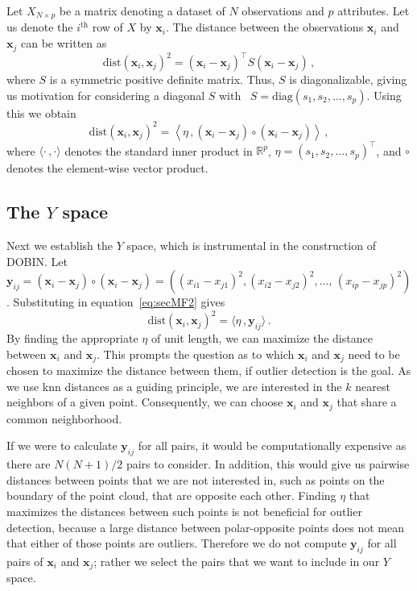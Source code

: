 \documentclass[letter,12pt]{article}
\newcommand{\dist}{\text{dist}}
\newcommand{\diag}{\text{diag}}
\begin{document}
Let $X_{N \times p}$ be a matrix denoting a dataset of $N$ observations and $p$ attributes. Let us denote the $i^{\text{th}}$ row of $X$ by $\bm{x}_i$. The distance between the observations $\bm{x}_i$ and $\bm{x}_j$ can be written as
\begin{equation}\label{eq:secMF1}
	\dist(\bm{x}_i, \bm{x}_j)^2 = ( \bm{x}_i - \bm{x}_j)^\top S ( \bm{x}_i - \bm{x}_j ) \, ,
\end{equation}
where $S$ is a symmetric positive definite matrix. {\color{blue} Thus, $S$ is diagonalizable, giving us motivation for considering a diagonal $S$ with } \ $S = \diag(s_1, s_2, \dots, s_p)$. Using this we obtain
\begin{equation}\label{eq:secMF2}
	\dist(\bm{x}_i, \bm{x}_j)^2 = \left\langle \eta\, , ( \bm{x}_i - \bm{x}_j )\circ ( \bm{x}_i - \bm{x}_j ) \right\rangle \,,
\end{equation}
where $\langle \cdot\, , \cdot \rangle$ denotes the standard inner product in $\mathbb{R}^p$, $\eta = (s_1, s_2, \dots, s_p)^\top$, and $\circ$ denotes the element-wise vector product. 



\subsection{The $Y$ space}\label{sec:MathFrame1}

Next we establish the $Y$ space, which is instrumental in the construction of DOBIN\@. Let $\bm{y}_{ij} = ( \bm{x}_i - \bm{x}_j )\circ ( \bm{x}_i - \bm{x}_j ) = \left( ( x_{i1} - x_{j1} )^2, ( x_{i2} - x_{j2} )^2, \dots, \, ( x_{ip} - x_{jp} )^2 \right)$. Substituting in equation~\eqref{eq:secMF2} gives
\begin{equation}\label{eq:secMF3}
	\dist(\bm{x}_i, \bm{x}_j)^2 = \langle \eta\, , \bm{y}_{ij} \rangle\, .
\end{equation}
By finding the appropriate $\eta$ of unit length, we can maximize the distance between $\bm{x}_i$ and $\bm{x}_j$. This prompts the question as to which $\bm{x}_i$ and $\bm{x}_j$ need to be chosen to maximize the distance between them, if outlier detection is the goal. As we use knn distances as a guiding principle, we are interested in the $k$ nearest neighbors of a given point. Consequently, we can choose $\bm{x}_i$ and $\bm{x}_j$ that share a common neighborhood.

If we were to calculate $\bm{y}_{ij}$ for all pairs, it would be computationally expensive as there are $N(N+1)/2$ pairs to consider. In addition, this would give us pairwise distances between points that we are not interested in, such as points on the boundary of the point cloud, that are opposite each other. Finding $\eta$ that maximizes the distances between such points is not beneficial for outlier detection, because a large distance between polar-opposite points does not mean that either of those points are outliers. Therefore we do not compute $\bm{y}_{ij}$ for all pairs of $\bm{x}_i$ and $\bm{x}_j$; rather we select the pairs that we want to include in our $Y$ space.
\end{document}
